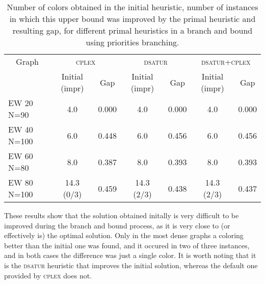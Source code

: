 \begin{table}[h]
\centering
\begin{tabular}{|l|cc|cc|cc|}
\hline
\multicolumn{1}{|c|}{Graph} & \multicolumn{2}{|c|}{\textsc{cplex}} & \multicolumn{2}{|c|}{\textsc{dsatur}} & \multicolumn{2}{|c|}{\textsc{dsatur}+\textsc{cplex}}
\\
& Initial (impr) & Gap & Initial (impr) & Gap & Initial (impr) & Gap\\
\hline
EW 20 N=90 & 4.0 & 0.000 & 4.0 & 0.000 & 4.0 & 0.000
\\
EW 40 N=100 & 6.0  & 0.448 & 6.0  & 0.456 & 6.0  & 0.456
\\
EW 60 N=80 & 8.0  & 0.387 & 8.0  & 0.393 & 8.0  & 0.393
\\
EW 80 N=100 & 14.3 (0/3) & 0.459 & 14.3 (2/3) & 0.438 & 14.3 (2/3) & 0.437
\\
\hline 
 \end{tabular}

\caption{Number of colors obtained in the initial heuristic, number of instances in which this upper bound was improved by the primal heuristic and resulting gap, for different primal heuristics in a branch and bound using priorities branching.}
\label{table:primal:prios}

\end{table}

These results show that the solution obtained initally is very difficult to be improved during the branch and bound process, as it is very close to (or effectively is) the optimal solution. Only in the most dense graphs a coloring better than the initial one was found, and it occured in two of three instances, and in both cases the difference was just a single color. It is worth noting that it is the \textsc{dsatur} heuristic that improves the initial solution, whereas the default one provided by \textsc{cplex} does not.


